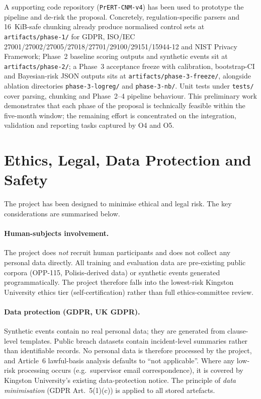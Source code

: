 \documentclass[12pt,a4paper,titlepage]{article}
\begin{document}
A supporting code repository (\texttt{PrERT-CNM-v4}) has been used to prototype the pipeline and de-risk the proposal. Concretely, regulation-specific parsers and 16~KiB-safe chunking already produce normalised control sets at \texttt{artifacts/phase-1/} for GDPR, ISO/IEC 27001/27002/27005/27018/27701/29100/29151/15944-12 and NIST Privacy Framework; Phase~2 baseline scoring outputs and synthetic events sit at \texttt{artifacts/phase-2/}; a Phase~3 acceptance freeze with calibration, bootstrap-CI and Bayesian-risk JSON outputs sits at \texttt{artifacts/phase-3-freeze/}, alongside ablation directories \texttt{phase-3-logreg/} and \texttt{phase-3-nb/}. Unit tests under \texttt{tests/} cover parsing, chunking and Phase~2--4 pipeline behaviour. This preliminary work demonstrates that each phase of the proposal is technically feasible within the five-month window; the remaining effort is concentrated on the integration, validation and reporting tasks captured by O4 and O5.

\section{Ethics, Legal, Data Protection and Safety}\label{sec:ethics}

The project has been designed to minimise ethical and legal risk. The key considerations are summarised below.

\paragraph{Human-subjects involvement.} The project does \emph{not} recruit human participants and does not collect any personal data directly. All training and evaluation data are pre-existing public corpora (OPP-115, Polisis-derived data) or synthetic events generated programmatically. The project therefore falls into the lowest-risk Kingston University ethics tier (self-certification) rather than full ethics-committee review.

\paragraph{Data protection (GDPR, UK GDPR).} Synthetic events contain no real personal data; they are generated from clause-level templates. Public breach datasets \parencite{enisa_tl_2024, prc_breaches} contain incident-level summaries rather than identifiable records. No personal data is therefore processed by the project, and Article~6 lawful-basis analysis defaults to ``not applicable''. Where any low-risk processing occurs (e.g.\ supervisor email correspondence), it is covered by Kingston University's existing data-protection notice. The principle of \emph{data minimisation} (GDPR Art.~5(1)(c)) is applied to all stored artefacts.
\end{document}
